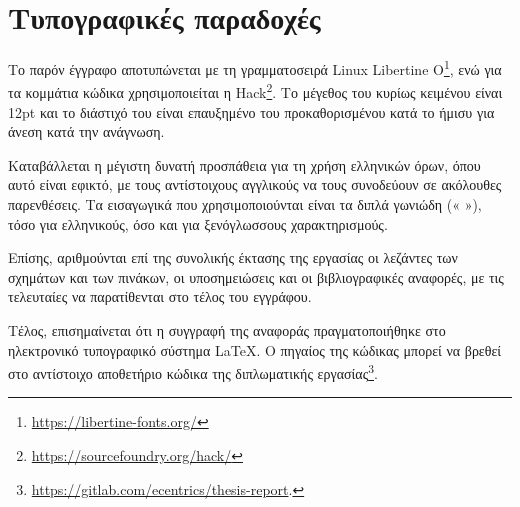 \section{Τυπογραφικές παραδοχές} \label{section:1-6-typography}

Το παρόν έγγραφο αποτυπώνεται με τη γραμματοσειρά Linux Libertine O\footnote{\url{https://libertine-fonts.org/}}, ενώ για τα κομμάτια κώδικα χρησιμοποιείται η Hack\footnote{\url{https://sourcefoundry.org/hack/}}. Το μέγεθος του κυρίως κειμένου είναι 12pt και το διάστιχό του είναι επαυξημένο του προκαθορισμένου κατά το ήμισυ για άνεση κατά την ανάγνωση.

Καταβάλλεται η μέγιστη δυνατή προσπάθεια για τη χρήση ελληνικών όρων, όπου αυτό είναι εφικτό, με τους αντίστοιχους αγγλικούς να τους συνοδεύουν σε ακόλουθες παρενθέσεις. Τα εισαγωγικά που χρησιμοποιούνται είναι τα διπλά γωνιώδη (« »), τόσο για ελληνικούς, όσο και για ξενόγλωσσους χαρακτηρισμούς.

Επίσης, αριθμούνται επί της συνολικής έκτασης της εργασίας οι λεζάντες των σχημάτων και των πινάκων, οι υποσημειώσεις και οι βιβλιογραφικές αναφορές, με τις τελευταίες να παρατίθενται στο τέλος του εγγράφου.

Τέλος, επισημαίνεται ότι η συγγραφή της αναφοράς πραγματοποιήθηκε στο ηλεκτρονικό τυπογραφικό σύστημα \LaTeX. Ο πηγαίος της κώδικας μπορεί να βρεθεί στο αντίστοιχο αποθετήριο κώδικα της διπλωματικής εργασίας\footnote{\url{https://gitlab.com/ecentrics/thesis-report}.}.

